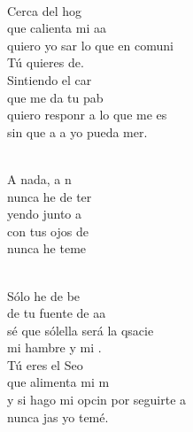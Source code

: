 \documentclass[12pt]{article}
\begin{document}
\begin{multicols*}{2}
\begin{cancion}%
	       \chord{(}{**)}{    }\\
	Cerca del hog  \\
	que calienta mi aa \\
	quiero yo sar lo que en comuni\\
	Tú quieres de.\\
\jump
	Sintiendo el car \\
	que me da tu pab \\
	quiero responr a lo que me es\\
	sin que a a yo pueda mer.\\\jump\\
	\begin{chorus}%
	A nada, a n  \\
	nunca he de ter\\
	yendo junto a \\
	con tus ojos de \\
	nunca he  teme\\
	\end{chorus}%
	\jump\\
	Sólo he de be \\
	de tu fuente de aa \\
	sé que sólella será la qsacie\\
	mi hambre y mi .\\
\jump
	Tú eres el Seo \\
	que alimenta mi m \\
	y si hago mi opcin por seguirte a\\
	nunca jas yo temé.\\\jump\\

\end{cancion}
\end{multicols*}
\end{document}
